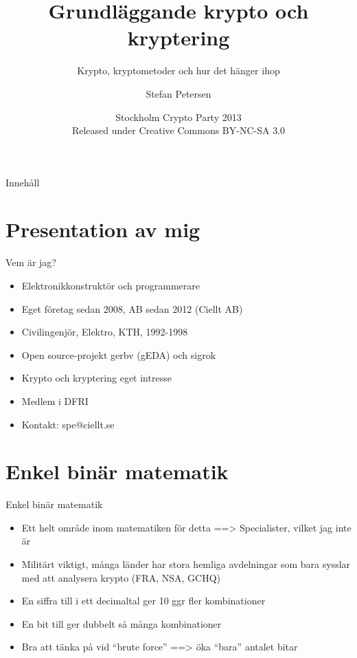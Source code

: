 \documentclass{beamer}
\title{Grundläggande krypto och kryptering}
\subtitle{Krypto, kryptometoder och hur det hänger ihop}
\author{Stefan Petersen}
\date[2013-02-16]{Stockholm Crypto Party 2013 \\
  Released under Creative Commons BY-NC-SA 3.0 \\
  \cc \byncsa}
\begin{document}
\begin{frame}
  \titlepage
\end{frame}
\begin{frame}{Innehåll}
  \tableofcontents
\end{frame}
\section{Presentation av mig}
\begin{frame}{Vem är jag?}
\begin{itemize}
\item Elektronikkonstruktör och programmerare
\item Eget företag sedan 2008, AB sedan 2012 (Ciellt AB)
\item Civilingenjör, Elektro, KTH, 1992-1998
\item Open source-projekt gerbv (gEDA) och sigrok
\item Krypto och kryptering eget intresse
\item Medlem i DFRI
\item Kontakt: spe@ciellt.se
\end{itemize}
\end{frame}

\section{Enkel binär matematik}

\begin{frame}{Enkel binär matematik}
\begin{itemize}
\item  Ett helt område inom matematiken för detta
\pause ==> Specialister, vilket jag inte är
\pause \item Militärt viktigt, många länder har stora hemliga avdelningar som 
bara sysslar med att analysera krypto (FRA, NSA, GCHQ)
\pause \item En siffra till i ett decimaltal ger 10 ggr fler kombinationer
\pause \item En bit till ger dubbelt så många kombinationer
\pause \item Bra att tänka på vid ``brute force''
\pause ==> öka ``bara'' antalet bitar
\end{itemize}
\end{frame}
\end{document}
